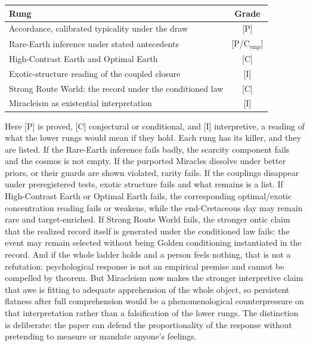 \begin{center}\small
\begin{tabular}{@{}lc@{}}
\toprule
Rung & Grade\\
\midrule
Accordance, calibrated typicality under the draw & [P]\\
Rare-Earth inference under stated antecedents & [P/C$_{\mathrm{emp}}$]\\
High-Contrast Earth and Optimal Earth & [C]\\
Exotic-structure reading of the coupled closure & [I]\\
Strong Route World: the record under the conditioned law & [C]\\
Miracleism as existential interpretation & [I]\\
\bottomrule
\end{tabular}
\end{center}
\noindent Here [P] is proved, [C] conjectural or conditional, and [I]
interpretive, a reading of what the lower rungs would mean if they hold.
Each rung has its killer, and they are listed. If the Rare-Earth
inference fails badly, the scarcity component fails and the cosmos is
not empty. If the purported Miracles dissolve under better priors, or
their guards are shown violated, rarity fails. If the couplings
disappear under preregistered tests, exotic structure fails and what
remains is a list. If High-Contrast Earth or Optimal Earth fails, the
corresponding optimal/exotic concentration reading fails or weakens,
while the end-Cretaceous day may remain rare and target-enriched. If
Strong Route World fails, the stronger ontic claim that the realized
record itself is generated under the conditioned law fails: the event
may remain selected without being Golden conditioning instantiated in
the record. And if the whole ladder holds and a person feels nothing, that is not
a refutation: psychological response is not an empirical premise and
cannot be compelled by theorem. But Miracleism now makes the stronger
interpretive claim that awe is fitting to adequate apprehension of the
whole object, so persistent flatness after full comprehension would be a
phenomenological counterpressure on that interpretation rather than a
falsification of the lower rungs. The distinction is deliberate: the
paper can defend the proportionality of the response without pretending
to measure or mandate anyone's feelings.

